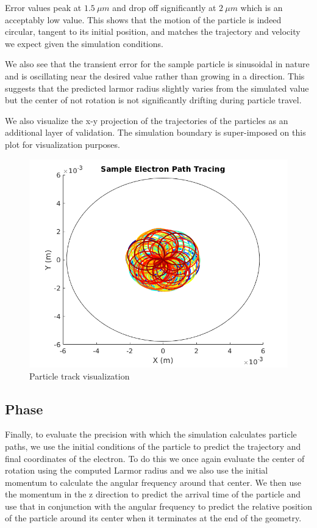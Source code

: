 \documentclass[12pt,letterpaper]{article}
\begin{document}
Error values peak at $1.5~\mu m$ and drop off significantly at $2~\mu m$ which is an acceptably low value. This shows that the motion of the particle is indeed circular, tangent to its initial position, and matches the trajectory and velocity we expect given the simulation conditions. 

We also see that the transient error for the sample particle is sinusoidal in nature and is oscillating near the desired value rather than growing in a direction. This suggests that the predicted larmor radius slightly varies from the simulated value but the center of not rotation is not significantly drifting during particle travel. 

We also visualize the x-y projection of the trajectories of the particles as an additional layer of validation. The simulation boundary is super-imposed on this plot for visualization purposes. 

    \begin{figure}[H]
    \centering
    \includegraphics[width=0.9\linewidth]{img/track.png}
    \caption{Particle track visualization}
    \end{figure}

\subsection{Phase}
    
Finally, to evaluate the precision with which the simulation calculates particle paths, we use the initial conditions of the particle to predict the trajectory and final coordinates of the electron. To do this we once again evaluate the center of rotation using the computed Larmor radius and we also use the initial momentum to calculate the angular frequency around that center. We then use the momentum in the z direction to predict the arrival time of the particle and use that in conjunction with the angular frequency to predict the relative position of the particle around its center when it terminates at the end of the geometry. 
\end{document}
